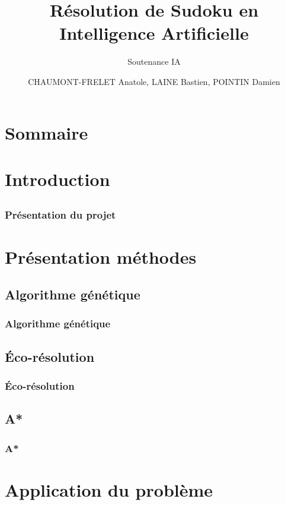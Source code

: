 \documentclass{beamer}
\title{R\'esolution de Sudoku en Intelligence Artificielle}
\subtitle{Soutenance IA}
\author{CHAUMONT-FRELET Anatole, LAINE Bastien, POINTIN Damien}
\institute{Génie Mathématique | INSA Rouen}
\begin{document}
    \beamertemplatenavigationsymbolsempty

    \begin{frame}
        \titlepage{}
    \end{frame}

    \section*{Sommaire}
        \begin{frame}
            \tableofcontents
        \end{frame}

    \section{Introduction}
        \subsection{}
            \begin{frame}
                \frametitle{Présentation du projet}
            \end{frame}

    \section{Pr\'esentation m\'ethodes}
        \subsection{Algorithme génétique}
            \begin{frame}
                \frametitle{Algorithme génétique}
            \end{frame}
        \subsection{Éco-résolution}
            \begin{frame}
                \frametitle{Éco-résolution}
            \end{frame}
        \subsection{A*}
            \begin{frame}
                \frametitle{A*}
            \end{frame}

    \section{Application du problème}
\end{document}
